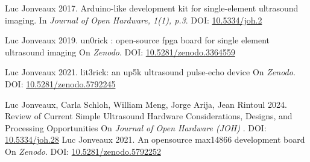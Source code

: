 \documentclass{article}
\begin{document}
\begin{thebibliography}{1}

  Luc Jonveaux 2017.
  \newblock  Arduino-like development kit for single-element ultrasound imaging. 
  \newblock In {\em  Journal of Open Hardware, 1(1), p.3}. DOI: \href{http://doi.org/10.5334/joh.2}{10.5334/joh.2}
  
  Luc Jonveaux 2019.
  \newblock  un0rick : open-source fpga board for single element ultrasound imaging
  \newblock On {\em  Zenodo}. DOI: \href{http://doi.org/10.5281/zenodo.3364559}{10.5281/zenodo.3364559}
  
  Luc Jonveaux 2021.
  \newblock lit3rick: an up5k ultrasound pulse-echo device %
  \newblock On {\em  Zenodo}. DOI: \href{http://doi.org/10.5281/zenodo.5792245}{10.5281/zenodo.5792245}
  
  Luc Jonveaux, Carla Schloh, William Meng, Jorge Arija, Jean Rintoul 2024.
  \newblock Review of Current Simple Ultrasound Hardware Considerations, Designs, and Processing Opportunities
  \newblock On {\em  Journal of Open Hardware (JOH) }. DOI: \href{http://doi.org/10.5334/joh.28}{10.5334/joh.28}
  Luc Jonveaux 2021.
  \newblock An opensource max14866 development board %
  \newblock On {\em  Zenodo}. DOI: \href{http://doi.org/10.5281/zenodo.5792252}{10.5281/zenodo.5792252}
  
\end{thebibliography}
\end{document}
